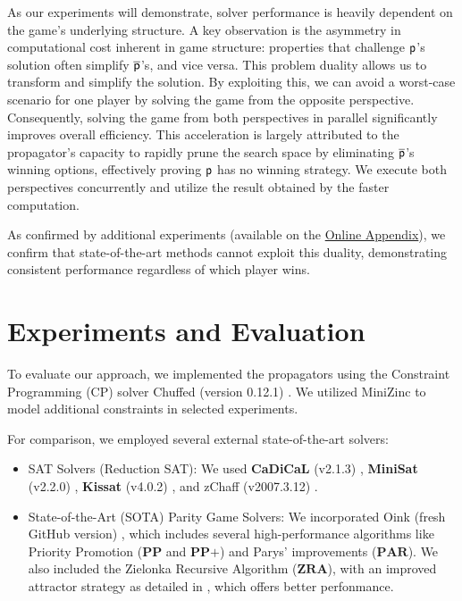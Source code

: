 \documentclass[runningheads]{llncs}
\begin{document}
As our experiments will demonstrate, solver performance is heavily dependent on the game's underlying structure. A key observation is the asymmetry in computational cost inherent in game structure: properties that challenge $\mathsf{p}$'s solution often simplify $\overline{\mathsf{p}}$'s, and vice versa. This problem duality allows us to transform and simplify the solution. By exploiting this, we can avoid a worst-case scenario for one player by solving the game from the opposite perspective. Consequently, solving the game from both perspectives in parallel significantly improves overall efficiency. This acceleration is largely attributed to the \noc propagator's capacity to rapidly prune the search space by eliminating $\overline{\mathsf{p}}$'s winning options, effectively proving $\mathsf{p}$ has no winning strategy. We execute both perspectives concurrently and utilize the result obtained by the faster computation.

As confirmed by additional experiments (available on the \href{https://figshare.com/s/38b43592b1047a9b893a}{Online Appendix}), we confirm that state-of-the-art methods cannot exploit this duality, demonstrating consistent performance regardless of which player wins.

\section{Experiments and Evaluation}\label{sec:experiments}

To evaluate our approach, we implemented the \noc propagators using the Constraint Programming (CP) solver Chuffed (version 0.12.1) \cite{chuffed:2018}. We utilized MiniZinc \cite{DBLP:conf/cp/NethercoteSBBDT07} to model additional constraints in selected experiments.

For comparison, we employed several external state-of-the-art solvers: 
\begin{itemize}
    \item SAT Solvers (Reduction SAT): We used \textbf{CaDiCaL} (v2.1.3) \cite{Biere:Cadical:2024}, \textbf{MiniSat} (v2.2.0) \cite{Een:MiniSat:2003}, \textbf{Kissat} (v4.0.2) \cite{Biere:Kissat:2024}, and zChaff (v2007.3.12) \cite{Moskewicz:zChaff:2001}.
    \item State-of-the-Art (SOTA) Parity Game Solvers: We incorporated Oink (fresh GitHub version) \cite{vanDijk:2018}, which includes several high-performance algorithms like Priority Promotion ($\textbf{PP}$ and $\textbf{PP+}$) and Parys' improvements ($\textbf{PAR}$). We also included the Zielonka Recursive Algorithm ($\textbf{ZRA}$), with an improved attractor strategy as detailed in \cite{Aggarwal:2023}, which offers better perfonmance. 
\end{itemize}
\end{document}
